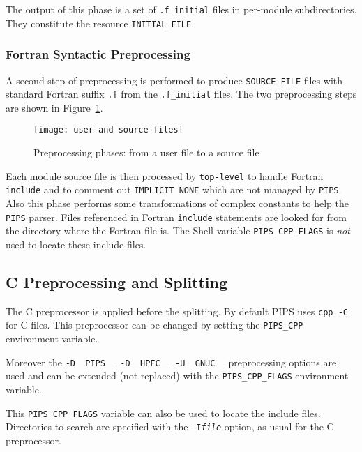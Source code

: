 \documentclass[a4paper]{report}
\newcommand{\Pips}{\texttt{PIPS}}
\begin{document}
The output of this phase is a set of \verb|.f_initial| files in per-module
subdirectories. They constitute the resource \verb|INITIAL_FILE|.


\subsubsection{Fortran Syntactic Preprocessing}
\label{subsection-syntactic-preprocessing}

A second step of preprocessing is performed to produce \verb/SOURCE_FILE/
files with standard Fortran suffix \texttt{.f} from the \verb|.f_initial|
files. The two preprocessing steps are shown in
Figure~\ref{figure-user-and-source-files}.

\begin{figure}
\begin{center}
\mbox{\texttt{[image: user-and-source-files]}}
\end{center}
\caption{Preprocessing phases: from a user file to a source file}
\label{figure-user-and-source-files}
\end{figure}

Each module source file is then processed by \texttt{top-level} to handle
Fortran \verb|include| and to comment out \texttt{IMPLICIT NONE} which are
not managed by \Pips{}. Also this phase performs some transformations of
complex constants to help the \Pips{} parser. Files referenced in Fortran
\texttt{include} statements are looked for from the directory where the
Fortran file is. The Shell variable \verb|PIPS_CPP_FLAGS| is {\em not}
used to locate these include files.


\subsection{C Preprocessing and Splitting}
\label{sec:c-case-preprocessing}

The C preprocessor is applied before the splitting. By default PIPS uses
\verb|cpp -C| for C files. This preprocessor can be changed by setting
the \verb|PIPS_CPP| environment variable.

Moreover the \verb|-D__PIPS__ -D__HPFC__ -U__GNUC__| preprocessing options
are used and can be extended (not replaced) with the \verb|PIPS_CPP_FLAGS|
environment variable.

This \verb|PIPS_CPP_FLAGS| variable can also be used to locate the include
files. Directories to search are specified with the \texttt{-I\emph{file}}
option, as usual for the C preprocessor.
\end{document}
